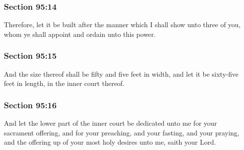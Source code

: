 	\subsubsection{Section 95:14} %
		\label{DC95-14}

		Therefore, let it be built after the manner which I shall show unto three of you, whom ye shall appoint and ordain unto this power.


	\subsubsection{Section 95:15} %
		\label{DC95-15}

		And the size thereof shall be fifty and five feet in width, and let it be sixty-five feet in length, in the inner court thereof.


	\subsubsection{Section 95:16} %
		\label{DC95-16}

		And let the lower part of the inner court be dedicated unto me for your sacrament offering, and for your preaching, and your fasting, and your praying, and the offering up of your most holy desires unto me, saith your Lord.


